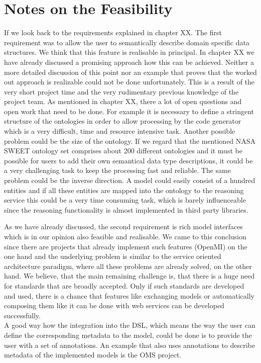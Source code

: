 \section{Notes on the Feasibility}
\par
If we look back to the requirements explained in chapter XX. The first requirement was to allow the user to semantically describe domain specific data structures. We think that this feature is realisable in principal. In chapter XX we have already discussed a promising approach how this can be achieved. Neither a more detailed discussion of this point nor an example that proves that the worked out approach is realizable could not be done unfortunately. This is a result of the very short project time and the very rudimentary previous knowledge of the project team.  As mentioned in chapter XX, there a lot of open questions and open work that need to be done. For example it is necessary to define a stringent structure of the ontologies in order to allow processing by the code generator which is a very difficult, time and resource intensive task. Another possible problem could be the size of the ontology. If we regard that the mentioned NASA SWEET ontology set comprises about 200 different ontologies and it must be possible for users to add their own semantical data type descriptions, it could be a very challenging task to keep the processing fast and reliable. The same problem could be the inverse direction. A model could easily consist of a hundred entities and if all these entities are mapped into the ontology to the reasoning service this could be a very time consuming task, which is barely influenceable since the reasoning functionality is almost implemented in third party libraries.
\par
As we have already discussed, the second requirement is rich model interfaces which is in our opinion also feasible and realisable. We came to this conclusion since there are projects that already implement such features (OpenMI) on the one hand and the underlying problem is similar to the service oriented architecture paradigm, where all these problems are already solved, on the other hand. We believe, that the main remaining challenge is, that there is a huge need for standards that are broadly accepted. Only if such standards are developed and used, there is a chance that features like exchanging models or automatically composing them like it can be done with web services can be developed successfully.\\
A good way how the integration into the DSL, which means the way the user can define the corresponding metadata to the model, could be done is to provide the user with a set of annotations. An example that also uses annotations to describe metadata of the implemented models is the OMS project.

